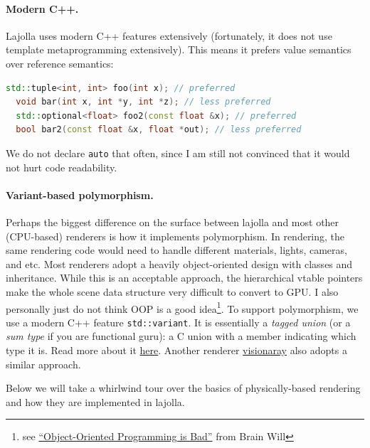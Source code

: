 \paragraph{Modern C++.} Lajolla uses modern C++ features extensively (fortunately, it does not use template metaprogramming extensively). This means it prefers value semantics over reference semantics:
\begin{lstlisting}[language=C++]
  std::tuple<int, int> foo(int x); // preferred
  void bar(int x, int *y, int *z); // less preferred
  std::optional<float> foo2(const float &x); // preferred
  bool bar2(const float &x, float *out); // less preferred
\end{lstlisting}
We do not declare \lstinline{auto} that often, since I am still not convinced that it would not hurt code readability.

\paragraph{Variant-based polymorphism.} Perhaps the biggest difference on the surface between lajolla and most other (CPU-based) renderers is how it implements polymorphism. In rendering, the same rendering code would need to handle different materials, lights, cameras, and etc. Most renderers adopt a heavily object-oriented design with classes and inheritance. While this is an acceptable approach, the hierarchical vtable pointers make the whole scene data structure very difficult to convert to GPU. I also personally just do not think OOP is a good idea\footnote{see \href{https://www.youtube.com/watch?v=QM1iUe6IofM}{``Object-Oriented Programming is Bad''} from Brain Will}. To support polymorphism, we use a modern C++ feature \lstinline{std::variant}. It is essentially a \emph{tagged union} (or a \emph{sum type} if you are functional guru): a C union with a member indicating which type it is. Read more about it \href{https://www.cppstories.com/2020/04/variant-virtual-polymorphism.html/}{here}. Another renderer \href{https://github.com/szellmann/visionaray}{visionaray} also adopts a similar approach.

Below we will take a whirlwind tour over the basics of physically-based rendering and how they are implemented in lajolla.


